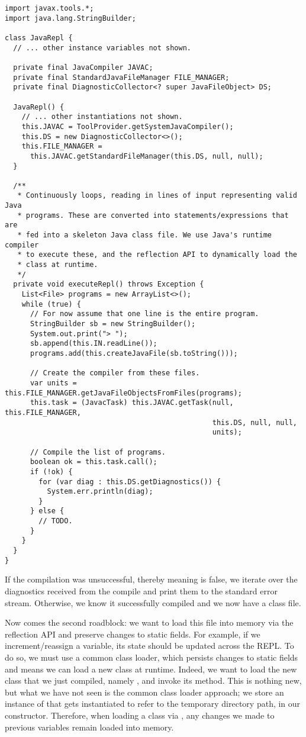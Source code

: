 \begin{lstlisting}[language=MyJava]
import javax.tools.*;
import java.lang.StringBuilder;

class JavaRepl {
  // ... other instance variables not shown.

  private final JavaCompiler JAVAC;
  private final StandardJavaFileManager FILE_MANAGER;
  private final DiagnosticCollector<? super JavaFileObject> DS;

  JavaRepl() {
    // ... other instantiations not shown.
    this.JAVAC = ToolProvider.getSystemJavaCompiler();
    this.DS = new DiagnosticCollector<>();
    this.FILE_MANAGER = 
      this.JAVAC.getStandardFileManager(this.DS, null, null);
  }

  /**
   * Continuously loops, reading in lines of input representing valid Java
   * programs. These are converted into statements/expressions that are 
   * fed into a skeleton Java class file. We use Java's runtime compiler 
   * to execute these, and the reflection API to dynamically load the 
   * class at runtime.
   */
  private void executeRepl() throws Exception {
    List<File> programs = new ArrayList<>();
    while (true) {
      // For now assume that one line is the entire program.
      StringBuilder sb = new StringBuilder();
      System.out.print("> ");
      sb.append(this.IN.readLine());
      programs.add(this.createJavaFile(sb.toString()));

      // Create the compiler from these files.
      var units = this.FILE_MANAGER.getJavaFileObjectsFromFiles(programs);
      this.task = (JavacTask) this.JAVAC.getTask(null, this.FILE_MANAGER, 
                                                 this.DS, null, null, 
                                                 units);

      // Compile the list of programs.
      boolean ok = this.task.call();
      if (!ok) {
        for (var diag : this.DS.getDiagnostics()) {
          System.err.println(diag);
        }
      } else {
        // TODO.
      }
    }
  }
}
\end{lstlisting}

If the compilation was unsuccessful, thereby meaning  is false, we iterate over the diagnostics received from the compile and print them to the standard error stream. 
Otherwise, we know it successfully compiled and we now have a class file.

Now comes the second roadblock: we want to load this file into memory via the reflection API and preserve changes to static fields. 
For example, if we increment/reassign a variable, its state should be updated across the REPL. 
To do so, we must use a common class loader, which persists changes to static fields and means we can load a new class at runtime. 
Indeed, we want to load the new class that we just compiled, namely , and invoke its  method. 
This is nothing new, but what we have not seen is the common class loader approach; we store an instance of  that gets instantiated to refer to the temporary directory path, in our constructor. 
Therefore, when loading a class via , any changes we made to previous variables remain loaded into memory.

